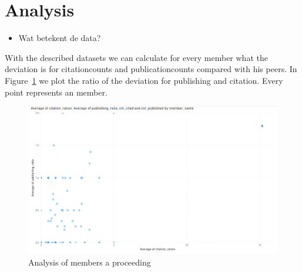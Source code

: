 \documentclass{ou-report}
\newcommand{\outline}[1]{{\color{blue} #1}}
\begin{document}



\section{Analysis}
\outline{
\begin{itemize}
    \item Wat betekent de data?
\end{itemize}
}
With the described datasets we can calculate for every member what the deviation
is for citationcounts and publicationcounts compared with his peers. 
In Figure~\ref{fig:analysis_members} we plot the ratio of the deviation for 
publishing and citation. Every point represents an member.
\begin{figure}[H]
    \centering
    \includegraphics[width=16cm]{images/analysis_members.png}
    \caption{Analysis of members a proceeding}
    \label{fig:analysis_members}
\end{figure}
\end{document}
